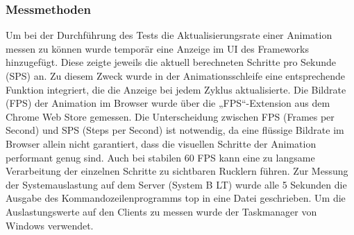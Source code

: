 \subsubsection{Messmethoden}
\label{chap:messmethoden}
Um bei der Durchführung des Tests die Aktualisierungsrate einer Animation messen zu können wurde temporär eine Anzeige im UI des Frameworks hinzugefügt. 
Diese zeigte jeweils die aktuell berechneten Schritte pro Sekunde (SPS) an.
Zu diesem Zweck wurde in der Animationsschleife eine entsprechende Funktion integriert,
die die Anzeige bei jedem Zyklus aktualisierte.
Die Bildrate (FPS) der Animation im Browser wurde über die „FPS“-Extension aus dem Chrome Web Store gemessen.
Die Unterscheidung zwischen FPS (Frames per Second) und SPS (Steps per Second) ist notwendig, da eine flüssige Bildrate im Browser allein nicht garantiert,
dass die visuellen Schritte der Animation performant genug sind. Auch bei stabilen 60 FPS kann eine zu langsame Verarbeitung der einzelnen Schritte zu sichtbaren Rucklern führen.
Zur Messung der Systemauslastung auf dem Server (System B LT) wurde alle 5 Sekunden die Ausgabe des Kommandozeilenprogramms top in eine Datei geschrieben.
Um die Auslastungswerte auf den Clients zu messen wurde der Taskmanager von Windows verwendet.



